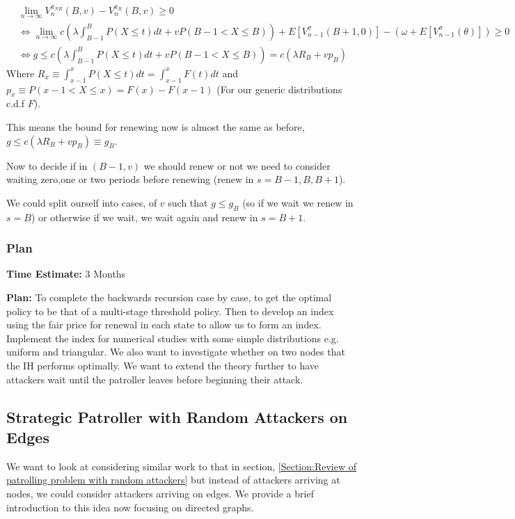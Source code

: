 \documentclass[a4paper,10pt]{article}
\theoremstyle{definition}
\theoremstyle{definition}
\theoremstyle{remark}
\theoremstyle{definition}
\begin{document}
\begin{align*}
&\lim\limits_{n \rightarrow \infty} V_{n}^{\pi_{NR}} (B,v) - V_{n}^{\pi_{R}}(B,v) \geq 0 \\
& \iff \lim\limits_{n \rightarrow \infty} c (\lambda \int_{B-1}^{B} P(X \leq t ) dt + v P(B-1 < X \leq B)) + E[V_{n-1}^{\sigma}(B+1,0)] - (\omega + E[V_{n-1}^{\sigma}(\theta)]) \geq 0 \\
& \iff g \leq c (\lambda \int_{B-1}^{B} P(X \leq t ) dt +v P(B-1 < X \leq B)) = c( \lambda R_{B} + v p_{B})
\end{align*}
Where $R_{x} \equiv \int_{x-1}^{x} P(X \leq t ) dt = \int_{x-1}^{x} F(t) dt$ and $p_{x} \equiv P(x-1 < X \leq x) = F(x)-F(x-1)$ (For our generic distributions c.d.f $F$).

This means the bound for renewing now is almost the same as before, $g \leq c (\lambda R_{B} + v p_{B}) \equiv g_{B}$.

Now to decide if in $(B-1,v)$ we should renew or not we need to consider waiting zero,one or two periods before renewing (renew in $s=B-1,B,B+1$).

We could split ourself into cases, of $v$ such that $g \leq g_{B}$ (so if we wait we renew in $s=B$) or otherwise if we wait, we wait again and renew in $s=B+1$.

\subsubsection{Plan}
\textbf{Time Estimate:} 3 Months

\textbf{Plan:} To complete the backwards recursion case by case, to get the optimal policy to be that of a multi-stage threshold policy. Then to develop an index using the fair price for renewal in each state to allow us to form an index. Implement the index for numerical studies with some simple distributions e.g. uniform and triangular. We also want to investigate whether on two nodes that the IH performs optimally. We want to extend the theory further to have attackers wait until the patroller leaves before beginning their attack. 

\subsection{Strategic Patroller with Random Attackers on Edges}
We want to look at considering similar work to that in section, \ref{Section:Review of patrolling problem with random attackers} but instead of attackers arriving at nodes, we could consider attackers arriving on edges. We provide a brief introduction to this idea now focusing on directed graphs.
\end{document}
